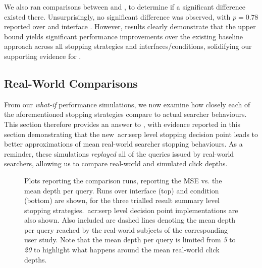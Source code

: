 We also ran comparisons between  and , to determine if a significant difference existed there. Unsurprisingly, no significant difference was observed, with $p=0.78$ reported over  and interface . However, results clearly demonstrate that the upper bound  yields significant performance improvements over the existing baseline approach across all stopping strategies and interfaces/conditions, solidifying our supporting evidence for .

\subsection{Real-World Comparisons}\label{sec:serp:results:comparisons}
From our \emph{what-if} performance simulations, we now examine how closely each of the aforementioned stopping strategies compare to actual searcher behaviours. This section therefore provides an answer to , with evidence reported in this section demonstrating that the new~\gls{acr:serp} level stopping decision point leads to better approximations of mean real-world searcher stopping behaviours. As a reminder, these simulations \emph{replayed} all of the queries issued by real-world searchers, allowing us to compare real-world and simulated click depths.

\begin{figure}[t!]
    \centering
    \caption[Real-world comparisons over the~\gls{acr:serp} decision point]{Plots reporting the comparison runs, reporting the MSE vs. the mean depth per query. Runs over interface  (top) and condition  (bottom) are shown, for the three trialled result summary level stopping strategies.~\gls{acr:serp} level decision point implementations are also shown. Also included are dashed lines denoting the mean depth per query reached by the real-world subjects of the corresponding user study. Note that the mean depth per query is limited from \emph{5} to \emph{20} to highlight what happens around the mean real-world click depths.}
    \label{fig:ch9_comparison_plots}
\end{figure}

